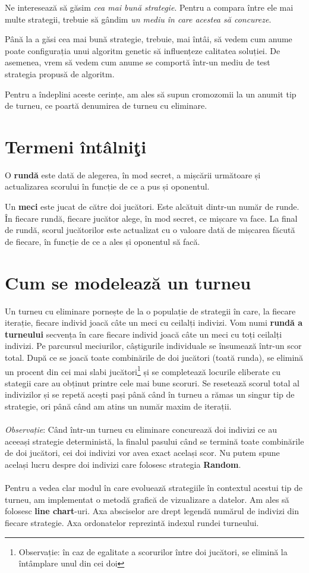 Ne interesează să găsim \textit{cea mai bună strategie}. Pentru a compara între ele mai multe strategii, trebuie să gândim \textit{un mediu în care acestea să concureze}. 
 
Până la a găsi cea mai bună strategie, trebuie, mai întâi, să vedem cum anume poate configurația unui algoritm genetic să influențeze calitatea soluției. De asemenea, vrem să vedem cum anume se comportă într-un mediu de test strategia propusă de algoritm. 
 
Pentru a îndeplini aceste cerințe, am ales să supun cromozomii la un anumit tip de turneu, ce poartă denumirea de turneu cu eliminare.  

\section {Termeni întâlniţi}
O \textbf{rundă} este dată de alegerea, în mod secret, a mișcării următoare și actualizarea scorului în funcție de ce a pus și oponentul. 

Un \textbf{meci} este jucat de către doi jucători. Este alcătuit dintr-un număr de runde. În fiecare rundă, fiecare jucător alege, în mod secret, ce mișcare va face. La final de rundă, scorul jucătorilor este actualizat cu o valoare dată de mișcarea făcută de fiecare, în funcție de ce a ales și oponentul să facă. 

\section {Cum se modelează un turneu}
 
Un turneu cu eliminare pornește de la o populație de strategii în care, la fiecare iterație, fiecare individ joacă câte un meci cu ceilalți indivizi. Vom numi \textbf{rundă a turneului} secvența în care fiecare individ joacă câte un meci cu toți ceilalți indivizi. Pe parcursul meciurilor, câștigurile individuale se însumează într-un scor total. După ce se joacă toate combinările de doi jucători (toată runda), se elimină un procent din cei mai slabi jucători\footnote{Observație: în caz de egalitate a scorurilor între doi jucători, se elimină la întâmplare unul din cei doi} și se completează locurile eliberate cu stategii care au obținut printre cele mai bune scoruri. Se resetează scorul total al indivizilor și se repetă acești pași până când în turneu a rămas un singur tip de strategie, ori până când am atins un număr maxim de iterații. 
\\\\
\textit{Observație}: Când într-un turneu cu eliminare concurează doi indivizi ce au aceeași strategie deterministă, la finalul pasului când se termină toate combinările de doi jucători, cei doi indivizi vor avea exact același scor. Nu putem spune același lucru despre doi indivizi care folosesc strategia \textbf{Random}.
\\\\
Pentru a vedea clar modul în care evoluează strategiile în contextul acestui tip de turneu, am implementat o metodă grafică de vizualizare a datelor. Am ales să folosesc \textbf{line chart}-uri. Axa absciselor are drept legendă numărul de indivizi din fiecare strategie. Axa ordonatelor reprezintă indexul rundei turneului. 

